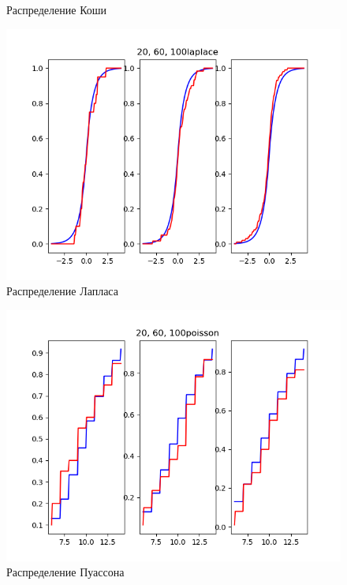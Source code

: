 \documentclass[a4]{article}
\begin{document}
\begin{center}
\begin{figure}[h!]
				\caption[Распределение Коши]{Распределение Коши}
			\end{figure}
			\newpage
			\begin{figure}[h!]
				\includegraphics[width=\textwidth]{laplaceemp.png}
				\caption[Распределение Лапласа]{Распределение Лапласа}
			\end{figure}
			\newpage
			\begin{figure}[h!]
				\includegraphics[width=\textwidth]{poissonemp.png}
				\caption[Распределение Пуассона]{Распределение Пуассона}
			\end{figure}
			\newpage
			\begin{figure}[h!]

\end{figure}
\end{center}
\end{document}
